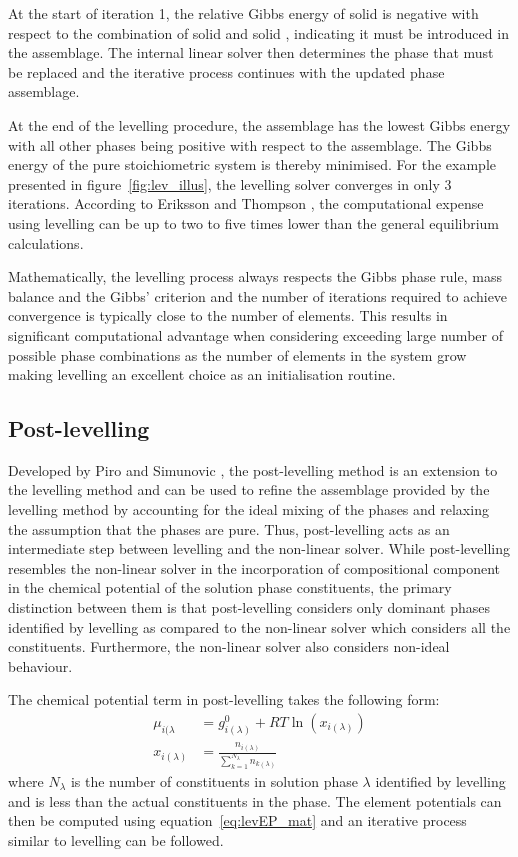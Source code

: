 	At the start of iteration 1, the relative Gibbs energy of solid  is negative with respect to the combination of solid  and solid , indicating it must be introduced in the assemblage. The internal linear solver then determines the phase that must be replaced and the iterative process continues with the updated phase assemblage.
	
	At the end of the levelling procedure, the assemblage has the lowest Gibbs energy with all other phases being positive with respect to the assemblage. The Gibbs energy of the pure stoichiometric system is thereby minimised. For the example presented in figure~\ref{fig:lev_illus}, the levelling solver converges in only 3 iterations. According to Eriksson and Thompson \cite{Eriksson89}, the computational expense using levelling can be up to two to five times lower than the general equilibrium calculations. 
	
	Mathematically, the levelling  process always respects the Gibbs phase rule, mass balance and the Gibbs' criterion and the number of iterations required to achieve convergence is typically close to the number of elements. This results in significant computational advantage when considering exceeding large number of possible phase combinations as the number of elements in the system grow making levelling an excellent choice as an initialisation routine.
		
	\subsection{Post-levelling}
	Developed by Piro and Simunovic \cite{Piro12a}, the post-levelling method is an extension to the levelling method and can be used to refine the assemblage provided by the levelling method by accounting for the ideal mixing of the phases and relaxing the assumption that the phases are pure. Thus, post-levelling acts as an intermediate step between levelling and the non-linear solver. While post-levelling resembles the non-linear solver in the incorporation of compositional component in the chemical potential of the solution phase constituents, the primary distinction between them is that post-levelling considers only dominant phases identified by levelling as compared to the non-linear solver which considers all the constituents. Furthermore, the non-linear solver also considers non-ideal behaviour.
		
		The chemical potential term in post-levelling takes the following form:
		\begin{equation}
			\begin{aligned}
				\mu_{i(\lambda} &= g_{i(\lambda)}^0 + RT \ln{(x_{i(\lambda)})} \\
				x_{i(\lambda)} &= \frac{n_{i(\lambda)}}{\sum_{k=1}^{N_{\lambda}}n_{k(\lambda)}}
			\end{aligned}
		\end{equation}
		where $N_{\lambda}$ is the number of constituents in solution phase $\lambda$ identified by levelling and is less than the actual constituents in the phase. The element potentials can then be computed using equation~\eqref{eq:levEP_mat} and an iterative process similar to levelling can be followed.
		
